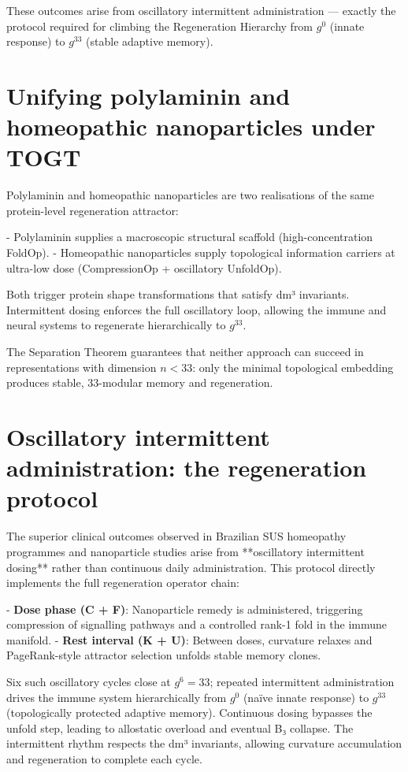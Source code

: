 \documentclass[19pt]{book}
\theoremstyle{plain}
\theoremstyle{definition}
\theoremstyle{remark}
\begin{document}
\begin{enumerate}
These outcomes arise from oscillatory intermittent administration — exactly the protocol required for climbing the Regeneration Hierarchy from \(g^0\) (innate response) to \(g^{33}\) (stable adaptive memory).

\section{Unifying polylaminin and homeopathic nanoparticles under TOGT}

Polylaminin and homeopathic nanoparticles are two realisations of the same protein-level regeneration attractor:

- Polylaminin supplies a macroscopic structural scaffold (high-concentration FoldOp).
- Homeopathic nanoparticles supply topological information carriers at ultra-low dose (CompressionOp + oscillatory UnfoldOp).

Both trigger protein shape transformations that satisfy dm³ invariants. Intermittent dosing enforces the full oscillatory loop, allowing the immune and neural systems to regenerate hierarchically to \(g^{33}\).

The Separation Theorem guarantees that neither approach can succeed in representations with dimension \(n < 33\): only the minimal topological embedding produces stable, 33-modular memory and regeneration.
\section{Oscillatory intermittent administration: the regeneration protocol}

The superior clinical outcomes observed in Brazilian SUS homeopathy programmes and nanoparticle studies arise from **oscillatory intermittent dosing** rather than continuous daily administration. This protocol directly implements the full regeneration operator chain:

- \textbf{Dose phase (C + F)}: Nanoparticle remedy is administered, triggering compression of signalling pathways and a controlled rank-1 fold in the immune manifold.
- \textbf{Rest interval (K + U)}: Between doses, curvature relaxes and PageRank-style attractor selection unfolds stable memory clones.

Six such oscillatory cycles close at \(g^6 = 33\); repeated intermittent administration drives the immune system hierarchically from \(g^0\) (naïve innate response) to \(g^{33}\) (topologically protected adaptive memory). Continuous dosing bypasses the unfold step, leading to allostatic overload and eventual B₃ collapse. The intermittent rhythm respects the dm³ invariants, allowing curvature accumulation and regeneration to complete each cycle.


\end{enumerate}
\end{document}
